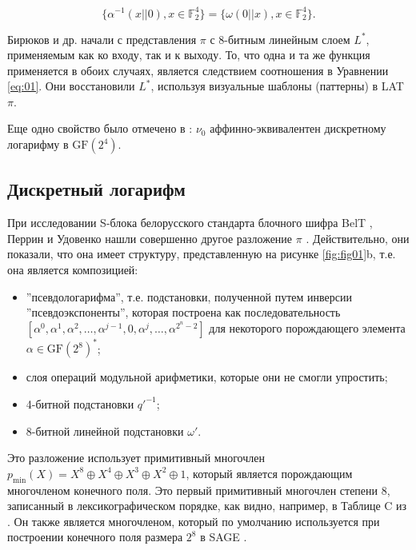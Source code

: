 \begin{equation}
\{\alpha^{-1}(x||0), x \in \mathbb{F}_2^4\} = \{\omega(0||x), x \in \mathbb{F}_2^4\}.
\label{eq:01}
\end{equation}

Бирюков и др. начали с представления \(\pi\) с 8-битным линейным слоем \(L^*\), применяемым как ко входу, так и к выходу. То, что одна и та же функция применяется в обоих случаях, является следствием соотношения в Уравнении \ref{eq:01}. Они восстановили \(L^*\), используя визуальные шаблоны (паттерны) в LAT \(\pi\).

Еще одно свойство было отмечено в \cite{PU16}: \(\nu_0\) аффинно-эквивалентен дискретному логарифму в \(\text{GF}(2^4)\).

\subsection{Дискретный логарифм}

При исследовании S-блока белорусского стандарта блочного шифра BelT \cite{Bel11}, Перрин и Удовенко нашли совершенно другое разложение \(\pi\) \cite{PU16}. Действительно, они показали, что она имеет структуру, представленную на рисунке \ref{fig:fig01}b, т.е. она является композицией:

\begin{itemize}
    \item ''псевдологарифма'', т.е. подстановки, полученной путем инверсии ''псевдоэкспоненты'', которая построена как последовательность \([\alpha^0, \alpha^1, \alpha^2, \ldots, \alpha^{j-1}, 0, \alpha^j, \ldots, \alpha^{2^n-2}]\) для некоторого порождающего элемента \(\alpha \in \text{GF}(2^8)^*\);
    \item слоя операций модульной арифметики, которые они не смогли упростить;
    \item 4-битной подстановки \(q'^{-1}\);
    \item 8-битной линейной подстановки \(\omega'\).
\end{itemize}

Это разложение использует примитивный многочлен \(p_{\text{min}}(X) = X^8 \oplus X^4 \oplus X^3 \oplus X^2 \oplus 1\), который является порождающим многочленом конечного поля. Это первый примитивный многочлен степени 8, записанный в лексикографическом порядке, как видно, например, в Таблице C из \cite{LN97}. Он также является многочленом, который по умолчанию используется при построении конечного поля размера \(2^8\) в SAGE \cite{Dev17}.

